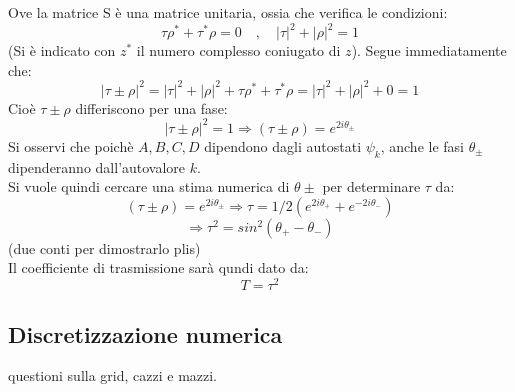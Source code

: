 Ove la matrice S è una matrice unitaria, ossia che verifica le condizioni:
$$ \tau\rho^* + \tau^*\rho = 0 \quad,\quad |\tau|^2 + |\rho|^2 = 1$$
(Si è indicato con $z^*$ il numero complesso coniugato di $z$). Segue immediatamente che:
$$ |\tau \pm \rho|^2 = |\tau|^2 + |\rho|^2 + \tau\rho^* + \tau^*\rho = |\tau|^2 + |\rho|^2 + 0 = 1$$
Cioè $\tau \pm \rho$ differiscono per una fase:
$$ |\tau \pm \rho|^2 = 1 \Rightarrow (\tau \pm \rho) = e^{2i\theta_\pm}$$
Si osservi che poichè $A,B,C,D$ dipendono dagli autostati $\psi_k$, anche le fasi $\theta_\pm$ dipenderanno dall'autovalore $k$.\\
Si vuole quindi cercare una stima numerica di $\theta\pm$ per determinare $\tau$ da:
    $$ (\tau \pm \rho) = e^{2i\theta_\pm} \Rightarrow \tau = 1/2(e^{2i\theta_+}+e^{-2i\theta_-})$$
    $$ \Rightarrow \tau^2 = sin^2(\theta_+ - \theta_-)$$
(due conti per dimostrarlo plis)
\\
Il coefficiente di trasmissione sarà qundi dato da:
    $$T = \tau^2$$

\subsection*{Discretizzazione numerica}
questioni sulla grid, cazzi e mazzi.

